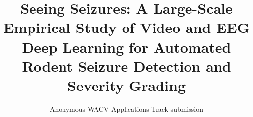 \documentclass[10pt,twocolumn,letterpaper]{article}
\title{Seeing Seizures: A Large-Scale Empirical Study of Video and EEG
Deep Learning for Automated Rodent Seizure Detection and Severity Grading}
\author{Anonymous WACV Applications Track submission}
\begin{document}
\maketitle










{
    \small
    
    
}

\clearpage
\appendix

\end{document}
